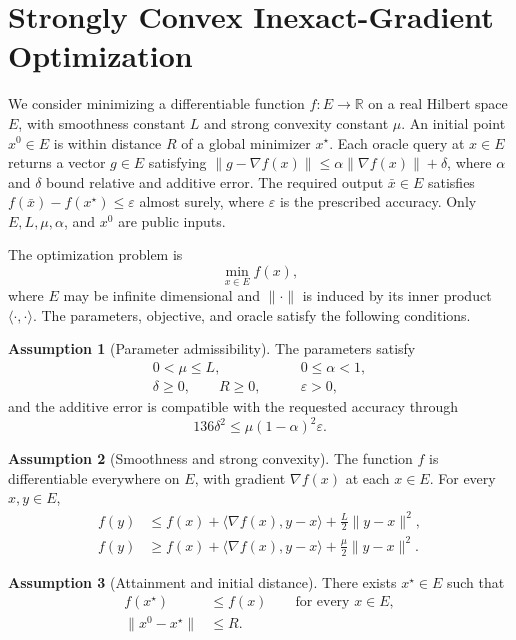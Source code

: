 \documentclass[10pt]{article}
\theoremstyle{definition}
\newtheorem{assumption}{Assumption}
\begin{document}
\section*{Strongly Convex Inexact-Gradient Optimization}
We consider minimizing a differentiable function $f:E\to\mathbb{R}$ on a real Hilbert space $E$, with smoothness constant $L$ and strong convexity constant $\mu$. An initial point $x^0\in E$ is within distance $R$ of a global minimizer $x^\star$. Each oracle query at $x\in E$ returns a vector $g\in E$ satisfying $\|g-\nabla f(x)\|\leq\alpha\|\nabla f(x)\|+\delta$, where $\alpha$ and $\delta$ bound relative and additive error. The required output $\bar{x}\in E$ satisfies $f(\bar{x})-f(x^\star)\leq\varepsilon$ almost surely, where $\varepsilon$ is the prescribed accuracy. Only $E,L,\mu,\alpha$, and $x^0$ are public inputs.

The optimization problem is
\[
\min_{x\in E} f(x),
\]
where $E$ may be infinite dimensional and $\|\cdot\|$ is induced by its inner product $\langle\cdot,\cdot\rangle$. The parameters, objective, and oracle satisfy the following conditions.

\begin{assumption}[Parameter admissibility]
The parameters satisfy
\[
\begin{aligned}
0<\mu\leq L,\qquad &0\leq\alpha<1,\\
\delta\geq0,\qquad R\geq0,\qquad &\varepsilon>0,
\end{aligned}
\]
and the additive error is compatible with the requested accuracy through
\[
136\delta^2\leq\mu(1-\alpha)^2\varepsilon.
\]
\end{assumption}

\begin{assumption}[Smoothness and strong convexity]
The function $f$ is differentiable everywhere on $E$, with gradient $\nabla f(x)$ at each $x\in E$. For every $x,y\in E$,
\[
\begin{aligned}
f(y)&\leq f(x)+\langle\nabla f(x),y-x\rangle
       +\frac{L}{2}\|y-x\|^2,\\
f(y)&\geq f(x)+\langle\nabla f(x),y-x\rangle
       +\frac{\mu}{2}\|y-x\|^2.
\end{aligned}
\]
\end{assumption}

\begin{assumption}[Attainment and initial distance]
There exists $x^\star\in E$ such that
\[
\begin{aligned}
f(x^\star)&\leq f(x)\qquad\text{for every }x\in E,\\
\|x^0-x^\star\|&\leq R.
\end{aligned}
\]
\end{assumption}
\end{document}
